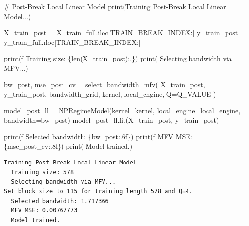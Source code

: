 \documentclass[
  letterpaper,
  DIV=11,
  numbers=noendperiod]{scrartcl}
\newenvironment{Shaded}{\begin{snugshade}}{\end{snugshade}}
\newcommand{\BuiltInTok}[1]{\textcolor[rgb]{0.00,0.23,0.31}{#1}}
\newcommand{\CommentTok}[1]{\textcolor[rgb]{0.37,0.37,0.37}{#1}}
\newcommand{\NormalTok}[1]{\textcolor[rgb]{0.00,0.23,0.31}{#1}}
\newcommand{\OperatorTok}[1]{\textcolor[rgb]{0.37,0.37,0.37}{#1}}
\newcommand{\SpecialCharTok}[1]{\textcolor[rgb]{0.37,0.37,0.37}{#1}}
\newcommand{\SpecialStringTok}[1]{\textcolor[rgb]{0.13,0.47,0.30}{#1}}
\newcommand{\StringTok}[1]{\textcolor[rgb]{0.13,0.47,0.30}{#1}}
\begin{document}
\begin{Shaded}
\begin{Highlighting}[]
\CommentTok{\# Post{-}Break Local Linear Model}
\BuiltInTok{print}\NormalTok{(}\StringTok{\textquotesingle{}Training Post{-}Break Local Linear Model...\textquotesingle{}}\NormalTok{)}

\NormalTok{X\_train\_post }\OperatorTok{=}\NormalTok{ X\_train\_full.iloc[TRAIN\_BREAK\_INDEX:]}
\NormalTok{y\_train\_post }\OperatorTok{=}\NormalTok{ y\_train\_full.iloc[TRAIN\_BREAK\_INDEX:]}

\BuiltInTok{print}\NormalTok{(}\SpecialStringTok{f\textquotesingle{}  Training size: }\SpecialCharTok{\{}\BuiltInTok{len}\NormalTok{(X\_train\_post)}\SpecialCharTok{:,\}}\SpecialStringTok{\textquotesingle{}}\NormalTok{)}
\BuiltInTok{print}\NormalTok{(}\StringTok{\textquotesingle{}  Selecting bandwidth via MFV...\textquotesingle{}}\NormalTok{)}

\NormalTok{bw\_post, mse\_post\_cv }\OperatorTok{=}\NormalTok{ select\_bandwidth\_mfv(}
\NormalTok{    X\_train\_post, y\_train\_post, bandwidth\_grid, kernel, local\_engine, Q}\OperatorTok{=}\NormalTok{Q\_VALUE}
\NormalTok{)}

\NormalTok{model\_post\_ll }\OperatorTok{=}\NormalTok{ NPRegimeModel(kernel}\OperatorTok{=}\NormalTok{kernel, local\_engine}\OperatorTok{=}\NormalTok{local\_engine, bandwidth}\OperatorTok{=}\NormalTok{bw\_post)}
\NormalTok{model\_post\_ll.fit(X\_train\_post, y\_train\_post)}

\BuiltInTok{print}\NormalTok{(}\SpecialStringTok{f\textquotesingle{}  Selected bandwidth: }\SpecialCharTok{\{}\NormalTok{bw\_post}\SpecialCharTok{:.6f\}}\SpecialStringTok{\textquotesingle{}}\NormalTok{)}
\BuiltInTok{print}\NormalTok{(}\SpecialStringTok{f\textquotesingle{}  MFV MSE: }\SpecialCharTok{\{}\NormalTok{mse\_post\_cv}\SpecialCharTok{:.8f\}}\SpecialStringTok{\textquotesingle{}}\NormalTok{)}
\BuiltInTok{print}\NormalTok{(}\StringTok{\textquotesingle{}  Model trained.\textquotesingle{}}\NormalTok{)}
\end{Highlighting}
\end{Shaded}

\begin{verbatim}
Training Post-Break Local Linear Model...
  Training size: 578
  Selecting bandwidth via MFV...
Set block size to 115 for training length 578 and Q=4.
  Selected bandwidth: 1.717366
  MFV MSE: 0.00767773
  Model trained.
\end{verbatim}
\end{document}
